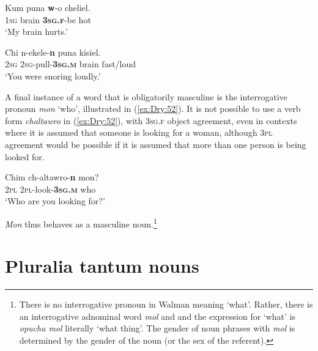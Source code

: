 \documentclass[output=collectionpaper]{langsci/langscibook}
\begin{document}
\ea \label{ex:Dry:50}
\gll Kum	puna	\textbf{w}-o	cheliel.\\
\textsc{1sg} brain \textbf{\textsc{3sg.f}}-be hot\\
\glt `My brain hurts.'
\z

\ea \label{ex:Dry:51}
\gll Chi	n-ekele-\textbf{n}	puna	kisiel.\\
\textsc{2sg} \textsc{2sg}-pull-\textbf{\textsc{3sg.m}} brain fast/loud\\
\glt `You were snoring loudly.'
\z

A final instance of a word that is obligatorily masculine is the interrogative pronoun \textit{mon} `who', illustrated in (\ref{ex:Dry:52}). It is not possible to use a verb form \textit{chaltawro} in (\ref{ex:Dry:52}), with \textsc{3sg.f} object agreement, even in contexts where it is assumed that someone is looking for a woman, although \textsc{3pl} agreement would be possible if it is assumed that more than one person is being looked for.

\ea \label{ex:Dry:52}
\gll Chim	ch-altawro-\textbf{n}	mon?\\
\textsc{2pl} \textsc{2pl}-look-\textbf{\textsc{3sg.m}} who\\
\glt `Who are you looking for?'
\z

\textit{Mon} thus behaves as a masculine noun.\footnote{There is no interrogative pronoun in Walman meaning `what'. Rather, there is an interrogative adnominal word \textit{mol} and and the expression for `what' is \textit{opucha mol} literally `what thing'. The gender of noun phrases with \textit{mol} is determined by the gender of the noun (or the sex of the referent).}

\section{Pluralia tantum nouns}
\label{sec:Dry:4}
\end{document}
